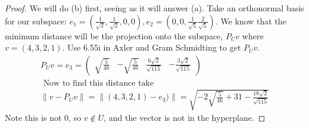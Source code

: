 \documentclass{article}
\begin{document}
\begin{proof}
    We will do (b) first, seeing as it will answer (a). Take an orthonormal basis for our subspace: $e_1 = (\frac{1}{\sqrt{2}}, \frac{1}{\sqrt{2}}, 0,0), e_2 = (0,0,\frac{1}{\sqrt{5}} \frac{2}{\sqrt{5}})$. We know that the minimum distance will be the projection onto the subspace, $P_Uv$ where $v=(4,3,2,1)$. Use 6.55i in Axler and Gram Schmidting to get $P_Uv$.
    \begin{gather*}
        P_Uv = e_3 = \begin{pmatrix}\sqrt{\frac{5}{46}}&-\sqrt{\frac{5}{46}}&\frac{6\sqrt{2}}{\sqrt{115}}&-\frac{3\sqrt{2}}{\sqrt{115}}\end{pmatrix} \\
        \text{ Now to find this distance take }\\
        \|v-P_Uv\| = \|(4,3,2,1) - e_3)\| = \sqrt{-2\sqrt{\frac{5}{46}}+31-\frac{18\sqrt{2}}{\sqrt{115}}}
    \end{gather*}
    Note this is not $0$, so $v\not\in U$, and the vector is not in the hyperplane.
\end{proof}
\end{document}
